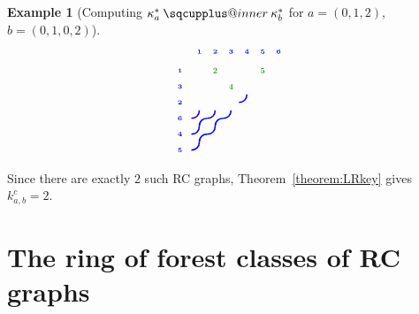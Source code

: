 \documentclass[a4paper,fleqn]{cas-sc}
\makeatletter
\newcommand{\sqcupplus@inner}[2]{%
  \vcenter{\hbox{\ooalign{%
    \hfil$\m@th#1\sqcup$\hfil\cr
    \hfil\raisebox{0.15ex}{$\m@th#1\scriptscriptstyle+$}\hfil\cr
  }}}%
}
\newcommand{\sqcupplus}{\mathbin{\mathpalette\sqcupplus@inner\relax}}
\theoremstyle{definition}
\newtheorem{example}[lemma]{Example}
\theoremstyle{remark}
\numberwithin{equation}{subsection}
\makeatother
\begin{document}
\begin{example}[Computing $\kappa_a^*\sqcupplus\kappa_b^*$ for $a=(0,1,2)$, $b=(0,1,0,2)$]
$$\begin{tikzpicture}[scale=0.45, baseline=(current bounding box.center)]
  \draw[blue, line width=1.125pt] (3.3,3.5) .. controls (3.6,3.5) and (3.8,3.7) .. (3.8,4);
  \draw[blue, line width=1.125pt] (0.3,2.5) .. controls (0.6,2.5) and (0.8,2.7) .. (0.8,3);
  \draw[blue, line width=1.125pt] (0.8,2) .. controls (0.8,2.3) and (1,2.5) .. (1.3,2.5);
  \draw[blue, line width=1.125pt] (1.3,2.5) .. controls (1.6,2.5) and (1.8,2.7) .. (1.8,3);
  \draw[blue, line width=1.125pt] (1.8,2) .. controls (1.8,2.3) and (2,2.5) .. (2.3,2.5);
  \draw[blue, line width=1.125pt] (2.3,2.5) .. controls (2.6,2.5) and (2.8,2.7) .. (2.8,3);
  \draw[blue, line width=1.125pt] (0.3,1.5) .. controls (0.6,1.5) and (0.8,1.7) .. (0.8,2);
  \draw[blue, line width=1.125pt] (0.8,1) .. controls (0.8,1.3) and (1,1.5) .. (1.3,1.5);
  \draw[blue, line width=1.125pt] (1.3,1.5) .. controls (1.6,1.5) and (1.8,1.7) .. (1.8,2);
  \draw[blue, line width=1.125pt] (0.3,0.5) .. controls (0.6,0.5) and (0.8,0.7) .. (0.8,1);
  \node[font=\tiny\bfseries, text=blue, anchor=south] at (0.8,6.3) {1};
  \node[font=\tiny\bfseries, text=blue, anchor=south] at (1.8,6.3) {2};
  \node[font=\tiny\bfseries, text=blue, anchor=south] at (2.8,6.3) {3};
  \node[font=\tiny\bfseries, text=blue, anchor=south] at (3.8,6.3) {4};
  \node[font=\tiny\bfseries, text=blue, anchor=south] at (4.8,6.3) {5};
  \node[font=\tiny\bfseries, text=blue, anchor=south] at (5.8,6.3) {6};
  \node[font=\tiny\bfseries, text=blue, anchor=east] at (0,5.5) {1};
  \node[font=\tiny\bfseries, text=blue, anchor=east] at (0,4.5) {3};
  \node[font=\tiny\bfseries, text=blue, anchor=east] at (0,3.5) {2};
  \node[font=\tiny\bfseries, text=blue, anchor=east] at (0,2.5) {6};
  \node[font=\tiny\bfseries, text=blue, anchor=east] at (0,1.5) {4};
  \node[font=\tiny\bfseries, text=blue, anchor=east] at (0,0.5) {5};
  \node[font=\Large\bfseries, text=green!60!black, fill=white, inner sep=0.5pt, circle, transform shape] at (1.8,5.5) {2};
  \node[font=\Large\bfseries, text=green!60!black, fill=white, inner sep=0.5pt, circle, transform shape] at (4.8,5.5) {5};
  \node[font=\Large\bfseries, text=green!60!black, fill=white, inner sep=0.5pt, circle, transform shape] at (2.8,4.5) {4};
\end{tikzpicture}
$$

Since there are exactly $2$ such RC graphs, Theorem~\ref{theorem:LRkey} gives $k_{a,b}^c = 2$.
\end{example}



\section{The ring of forest classes of RC graphs}\label{section:forest}
\end{document}
